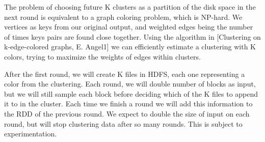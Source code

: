 \documentclass[12pt]{extarticle}
\begin{document}
The problem of choosing future K clusters as a partition of the disk space in the next round is equivalent to a graph coloring problem, which is NP-hard.  We vertices as keys from our original output, and weighted edges being the number of times keys pairs are found close together.  Using the algorithm in [Clustering on k-edge-colored graphs, E. Angel1] we can efficiently estimate a clustering with K colors, trying to maximize the weights of edges within clusters.

After the first round, we will create K files in HDFS, each one representing a color from the clustering.   Each round, we will double number of blocks as input, but we will still sample each block before deciding which of the K files to append it to in the cluster.  Each time we finish a round we will add this information to the RDD of the previous round.  We expect to double the size of input on each round, but will stop clustering data after so many rounds.  This is subject to experimentation.  


\begin{comment}
currently, web crawling agents 
that create MapReduce inputu
have no intelligent hdfs placement which 
creates a lot of overhead in the shuffle
phase.



We want to place data into hdfs by predicting 
its likely partition in the reduction
phase.
\end{comment}
\end{document}
